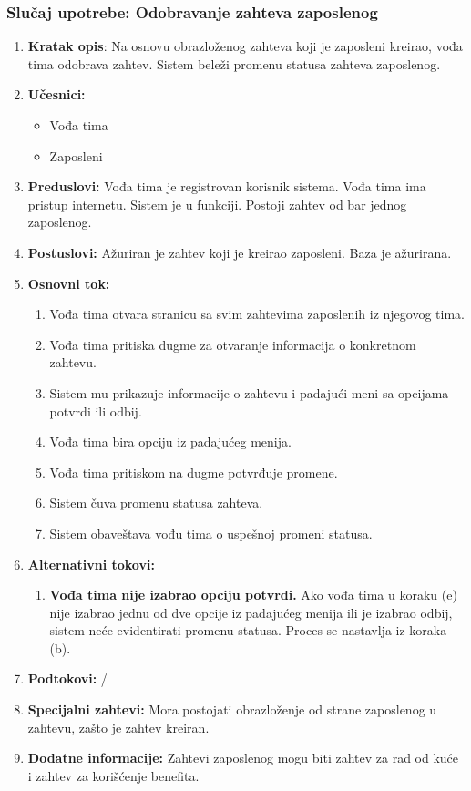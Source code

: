 \documentclass[a4paper]{article}
\begin{document}
\subsubsection{Slučaj upotrebe: Odobravanje zahteva zaposlenog}
\begin{enumerate}
    \item \textbf{Kratak opis}: Na osnovu obrazloženog zahteva koji je zaposleni kreirao, vođa tima odobrava zahtev. Sistem beleži promenu statusa zahteva zaposlenog.
    \item \textbf{Učesnici:}
        \begin{itemize}
            \item Vođa tima
            \item Zaposleni
        \end{itemize}
    \item \textbf{Preduslovi:} Vođa tima je registrovan korisnik sistema. Vođa tima ima pristup internetu. Sistem je u funkciji. Postoji zahtev od bar jednog zaposlenog.
    \item \textbf{Postuslovi:} Ažuriran je zahtev koji je kreirao zaposleni. Baza je ažurirana.
    \item \textbf{Osnovni tok:}
        \begin{enumerate}
            \item Vođa tima otvara stranicu sa svim zahtevima zaposlenih iz njegovog tima.
            \item Vođa tima pritiska dugme za otvaranje informacija o konkretnom zahtevu.
            \item Sistem mu prikazuje informacije o zahtevu i padajući meni sa opcijama potvrdi ili odbij.
            \item Vođa tima bira opciju iz padajućeg menija.
            \item Vođa tima pritiskom na dugme potvrđuje promene.
            \item Sistem čuva promenu statusa zahteva.
            \item Sistem obaveštava vođu tima o uspešnoj promeni statusa.
        \end{enumerate}
    \item \textbf{Alternativni tokovi:}
        \begin{enumerate}
            \item \textbf{Vođa tima nije izabrao opciju potvrdi.} Ako vođa tima u koraku (e) nije izabrao jednu od dve opcije iz padajućeg menija ili je izabrao odbij, sistem neće evidentirati promenu statusa. Proces se nastavlja iz koraka (b).
        \end{enumerate}
    \item \textbf{Podtokovi:} /
    \item \textbf{Specijalni zahtevi:} Mora postojati obrazloženje od strane zaposlenog u zahtevu, zašto je zahtev kreiran.
    \item \textbf{Dodatne informacije:} Zahtevi zaposlenog mogu biti zahtev za rad od kuće i zahtev za korišćenje benefita.
\end{enumerate}
\end{document}
